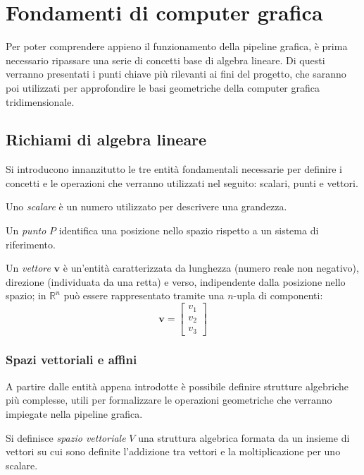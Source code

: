 \chapter{Fondamenti di computer grafica}

Per poter comprendere appieno il funzionamento della pipeline grafica, è prima necessario ripassare una serie di concetti base di algebra lineare.
Di questi verranno presentati i punti chiave più rilevanti ai fini del progetto, che saranno poi utilizzati per approfondire le basi geometriche della computer grafica tridimensionale.

%
%
\section{Richiami di algebra lineare}
Si introducono innanzitutto le tre entità fondamentali necessarie per definire i concetti e le operazioni che verranno utilizzati nel seguito: scalari, punti e vettori.

Uno \emph{scalare} è un numero utilizzato per descrivere una grandezza.

Un \emph{punto} $P$ identifica una posizione nello spazio rispetto a un sistema di riferimento.

Un \emph{vettore} $\mathbf{v}$ è un'entità caratterizzata da lunghezza (numero reale non negativo), direzione (individuata da una retta) e verso, indipendente dalla posizione nello spazio; in $\mathbb{R}^n$ può essere rappresentato tramite una $n$-upla di componenti:
\[
    \mathbf{v} = \begin{bmatrix} v_1 \\ v_2 \\ v_3 \end{bmatrix}
\]

\subsection{Spazi vettoriali e affini}
A partire dalle entità appena introdotte è possibile definire strutture algebriche più complesse, utili per formalizzare le operazioni geometriche che verranno impiegate nella pipeline grafica.

\begin{definizione}
    Si definisce \emph{spazio vettoriale} $V$ una struttura algebrica formata da un insieme di vettori su cui sono definite l'addizione tra vettori e la moltiplicazione per uno scalare.
\end{definizione}

